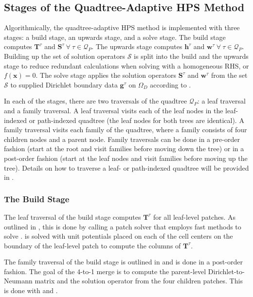 \subsection{Stages of the Quadtree-Adaptive HPS Method}
\label{sub:stages-of-the-quadtree-adaptive-hps-method}

Algorithmically, the quadtree-adaptive HPS method is implemented with three stages: a build stage, an upwards stage, and a solve stage. The build stage computes $\textbf{T}^{\tau}$ and $\textbf{S}^{\tau}\ \forall\ \tau \in \mathcal{Q}_P$. The upwards stage computes $\textbf{h}^{\tau}$ and $\textbf{w}^{\tau}\ \forall\ \tau \in \mathcal{Q}_P$. Building up the set of solution operators $\mathcal{S}$ is split into the build and the upwards stage to reduce redundant calculations when solving  with a homogeneous RHS, or $f(\textbf{x}) = 0$. The solve stage applies the solution operators $\textbf{S}^{\tau}$ and $\textbf{w}^{\tau}$ from the set $\mathcal{S}$ to supplied  Dirichlet boundary data $\textbf{g}^{\tau}$ on $\Omega_D$  according to .

In each of the stages, there are two traversals of the quadtree $\mathcal{Q}_P$: a leaf traversal and a family traversal. A leaf traversal visits each of the leaf nodes in the leaf-indexed or path-indexed quadtree (the leaf nodes for both trees are identical). A family traversal visits each family of the quadtree, where a family consists of four children nodes and a parent node. Family traversals can be done in a pre-order fashion (start at the root and visit families before moving down the tree) or in a post-order fashion (start at the leaf nodes and visit families before moving up the tree). Details on how to traverse a leaf- or path-indexed quadtree will be provided in .

\subsubsection{The Build Stage}

The leaf traversal of the build stage computes $\textbf{T}^{\tau}$ for all leaf-level patches. As outlined in \citep{chipman2024fast}, this is done by calling a patch solver that employs fast methods to solve .  is solved with unit potentials placed on each of the cell centers on the boundary of the leaf-level patch to compute the columns of $\textbf{T}^{\tau}$.

The family traversal of the build stage is outlined in  and is done in a post-order fashion. The goal of the 4-to-1 merge is to compute the parent-level Dirichlet-to-Neumann matrix and the solution operator from the four children patches. This is done with  and .

